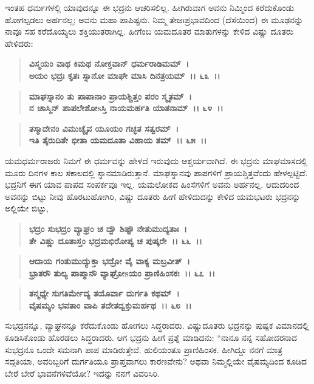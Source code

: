 ಇಂತಹ ಧರ್ಮಗಳಲ್ಲಿ ಯಾವುದನ್ನೂ ಈ ಭದ್ರನು ಆಚರಿಸಲಿಲ್ಲ. ಹೀಗಿರುವಾಗ ಅವನು ನಿಮ್ಮಿಂದ ಕರೆದುಕೊಂಡು ಹೋಗಲ್ಪಡಲು ಅರ್ಹನಲ್ಲ; ಅವನು ಮಹಾ ಪಾಪಿಷ್ಟನು. ನಿಮ್ಮ ತೇಜಃಪ್ರಭಾವದಿಂದ (ದೆಸೆಯಿಂದ) ಈ ಮೂಢನನ್ನು ನಾವೂ ಸಹ ಕರೆದೊಯ್ಯಲು ಶಕ್ತಿಯುತರಾಗಿಲ್ಲ. ಹೀಗೆಂಬ ಯಮದೂತರ ಮಾತುಗಳನ್ನು ಕೇಳಿದ ವಿಷ್ಣು ದೂತರು ಹೇಳಿದರು:

\begin{verse}
\textbf{ವಿಸ್ಮಯಂ ವಾಥ ಕಿಮಥ ನೋಕ್ತವಾನ್ ಧರ್ಮರಾಡಿಮಮ್~।}\\\textbf{ಅಯಂ ಭದ್ರಃ ಕೃತಃ ಸ್ನಾನೋ ಮಾಘೇ ಮಾಸಿ ದಿನತ್ರಯಮ್~।। ೬೩~।। }
\end{verse}

\begin{verse}
\textbf{ಮಾಘಸ್ನಾನಂ ತು ಪಾಪಾನಾಂ ಪ್ರಾಯಶ್ಚಿತ್ತಂ ಪರಂ ಸ್ಮೃತಮ್~।}\\\textbf{ನ ಚಾಸ್ಮಿನ್ ಪಾಪಲೇಶೋsಸ್ತಿ ನಾಯಮರ್ಹತಿ ಯಾತನಾಮ್~।। ೬೪~।। }
\end{verse}

\begin{verse}
\textbf{ತಸ್ಮಾದೇನಂ ವಿಮುಚ್ಯೈವ ಯೂಯಂ ಗಚ್ಛತ ಸತ್ವರಮ್~।}\\\textbf{ಇತಿ ತೈರುದಿತೇ ಭೀತಾ ಯಮದೂತಾ ವಿಹಾಯ ತಮ್~।। ೬೫~।।}
\end{verse}

ಯಮಧರ್ಮರಾಜರು ನಿಮಗೆ ಈ ಧರ್ಮವನ್ನು ಹೇಳದೆ ಇರುವುದು ಆಶ್ಚರ್ಯವಾಗಿದೆ. ಈ ಭದ್ರನು ಮಾಘಮಾಸದಲ್ಲಿ ಮೂರು ದಿನಗಳ ಕಾಲ ಸಕಾಲದಲ್ಲಿ ಸ್ನಾನಮಾಡಿರುತ್ತಾನೆ. ಮಾಘಸ್ನಾನವು ಪಾಪಗಳಿಗೆ ಪ್ರಾಯಶ್ಚಿತ್ತವೆಂದು ಹೇಳಲ್ಪಟ್ಟಿದೆ. ಭದ್ರನಿಗೆ ಈಗ ಯಾವ ಪಾಪದ ಸಂಪರ್ಕವೂ ಇಲ್ಲ. ಯಮಲೋಕದ ಹಿಂಸೆಗಳಿಗೆ ಅವನು ಅರ್ಹನಲ್ಲ. ಆದುದರಿಂದ ಅವನನ್ನು ಬಿಟ್ಟು ನೀವು ಹೊರಟುಹೋಗಿರಿ, ವಿಷ್ಣು ದೂತರು ಹೀಗೆ ಹೇಳಿದುದನ್ನು ಕೇಳಿದ ಯಮಭಟರು ಭದ್ರನನ್ನು ಅಲ್ಲಿಯೇ ಬಿಟ್ಟು,

\begin{verse}
\textbf{ಭದ್ರಂ ಸುಭದ್ರಂ ವ್ಯಾಘ್ರಂ ಚ ದ್ವೌ ಶಿಷ್ಟೌ ನೇತುಮುದ್ಯತಾಃ~।}\\\textbf{ತೇ ವಿಷ್ಣು ದೂತಾಸ್ತಂ ಭದ್ರಮಭಿರೋಪ್ಯ ಚ ಪುಷ್ಕರೇ~।। ೬೬~।। }
\end{verse}

\begin{verse}
\textbf{ಆದಾಯ ಗಂತುಮುದ್ಯುಕ್ತಾ ಭದ್ರೋ ವೈ ವಾಕ್ಯ ಮಬ್ರವೀತ್~।}\\\textbf{ಭ್ರಾತರೌ ತುಲ್ಯ ಪಾಪ್ಮಾನೌ ವ್ಯಾಘ್ರೋsಯಂ ಪ್ರಾಣಿಹಿಂಸಕಃ~।। ೬೭~।।} 
\end{verse}

\begin{verse}
\textbf{ತನ್ಮಧ್ಯೇ ಸುಗತಿರ್ಮೇದ್ಯ ತಯೊರ್ವಾ ದುರ್ಗತಿ ಕಥಮ್~।}\\\textbf{ವೈಷಮ್ಯಂ ಭವತಾಂ ವಾಪಿ ತದೇತದ್ವಕ್ತುಮರ್ಹಥ~।। ೬೮~।।}
\end{verse}

ಸುಭದ್ರನನ್ನೂ, ವ್ಯಾಘ್ರನನ್ನೂ ಕರೆದುಕೊಂಡು ಹೋಗಲು ಸಿದ್ಧರಾದರು. ವಿಷ್ಣುದೂತರು ಭದ್ರನನ್ನು ಪುಷ್ಪಕ ವಿಮಾನದಲ್ಲಿ ಕೂಡಿಸಿಕೊಂಡು ಹೊರಡಲು ಸಿದ್ಧರಾದರು. ಆಗ ಭದ್ರನು ಹೀಗೆ ಪ್ರಶ್ನೆ ಮಾಡಿದನು: “ನಾನೂ ನನ್ನ ಸಹೋದರನಾದ ಸುಭದ್ರನೂ ಒಂದೇ ಸಮನಾಗಿ ಪಾಪ ಮಾಡಿರುತ್ತೇವೆ. ಹುಲಿಯಂತೂ ಪ್ರಾಣಿಹಿಂಸಕ. ಹೀಗಿದ್ದೂ ನನಗೆ ಮಾತ್ರ ಸದ್ಗತಿಯಾ, ಅವರಿಬ್ಬರಿಗೆ ದುರ್ಗತಿಯೂ ಪ್ರಾಪ್ತವಾಗಲು ಕಾರಣವೇನು? ಅಥವಾ ನಿಮ್ಮಲ್ಲಿಯೇ ವೈಷಮ್ಯದಿಂದ ಕೂಡಿದ ಬೇರೆ ಬೇರೆ ಭಾವನೆಗಳಿವೆಯೋ? ಇದನ್ನು ನನಗೆ ವಿವರಿಸಿರಿ.

